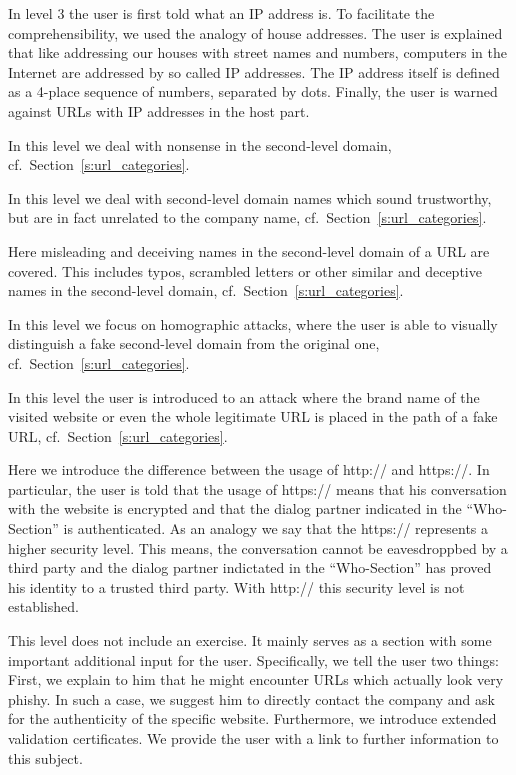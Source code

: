 \begin{description}[leftmargin=0cm]
	\item[Level 3] In level 3 the user is first told what an IP address is. To facilitate the comprehensibility, we used the analogy of house addresses. The user is explained that like addressing our houses with street names and numbers, computers in the Internet are addressed by so called IP addresses. The IP address itself is defined as a 4-place sequence of numbers, separated by dots. Finally, the user is warned against URLs with IP addresses in the host part.
	\item[Level 4] In this level we deal with nonsense in the second-level domain, cf.~Section~\ref{s:url_categories}.
	\item[Level 5] In this level we deal with second-level domain names which sound trustworthy, but are in fact unrelated to the company name, cf.~Section~\ref{s:url_categories}.
	\item[Level 6] Here misleading and deceiving names in the second-level domain of a URL are covered. This includes typos, scrambled letters or other similar and deceptive names in the second-level domain, cf.~Section~\ref{s:url_categories}.
	\item[Level 7] In this level we focus on homographic attacks, where the user is able to visually distinguish a fake second-level domain from the original one, cf.~Section~\ref{s:url_categories}.
	\item[Level 8] In this level the user is introduced to an attack where the brand name of the visited website or even the whole legitimate URL is placed in the path of a fake URL, cf.~Section~\ref{s:url_categories}.
	\item[Level 9] Here we introduce the difference between the usage of http:// and https://. In particular, the user is told that the usage of https:// means that his conversation with the website is encrypted and that the dialog partner indicated in the ``Who-Section'' is authenticated. As an analogy we say that the https:// represents a higher security level. This means, the conversation cannot be eavesdroppbed by a third party and the dialog partner indictated in the ``Who-Section'' has proved his identity to a trusted third party. With http:// this security level is not established.
	\item[Level 10] This level does not include an exercise. It mainly serves as a section with some important additional input for the user. Specifically, we tell the user two things: First, we explain to him that he might encounter URLs which actually look very phishy. In such a case, we suggest him to directly contact the company and ask for the authenticity of the specific website. Furthermore, we introduce extended validation certificates. We provide the user with a link to further information to this subject.
\end{description}

